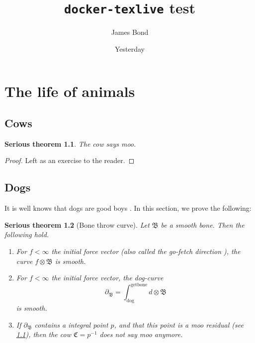 \documentclass[10pt, final]{book}
\title{\texttt{docker-texlive} test}
\author{James Bond}
\date{Yesterday}
\newtheorem{theorem}{Serious theorem}[section]
\begin{document}
\maketitle

\tableofcontents

\chapter{The life of animals}

\section{Cows}

\begin{theorem} \label{th:cow}
    The cow says \emph{moo}.
\end{theorem}
\begin{proof}
    Left as an exercise to the reader.
\end{proof}

\section{Dogs}

It is well knows that dogs are good boys \cite{ACampo2016,Escobar2017,Sergeev2007}. In this section, we prove the following:

\begin{theorem} [Bone throw curve] \label{th:dog}
    Let $\mathfrak{B}$ be a smooth bone. Then the following hold.
    \begin{enumerate}
        \item For $f < \infty$ the initial force vector (also called the go-fetch direction \cite{Beilinson2010}), the curve $f \otimes \mathfrak{B}$ is smooth.
        \item For $f < \infty$ the initial force vector, the dog-curve
        \[ \partial_{\mathfrak{B}} = \int_{\mathrm{dog}}^{\mathrm{get bone}} d \otimes \mathfrak{B} \]
        is smooth.
        \item If $\partial_{\mathfrak{B}}$ contains a integral point $p$, and that this point is a \emph{moo} residual (see \ref{th:cow}), then the cow $\mathfrak{C} = p^{-1}$ does not say \emph{moo} anymore.
    \end{enumerate}
\end{theorem}
\end{document}
